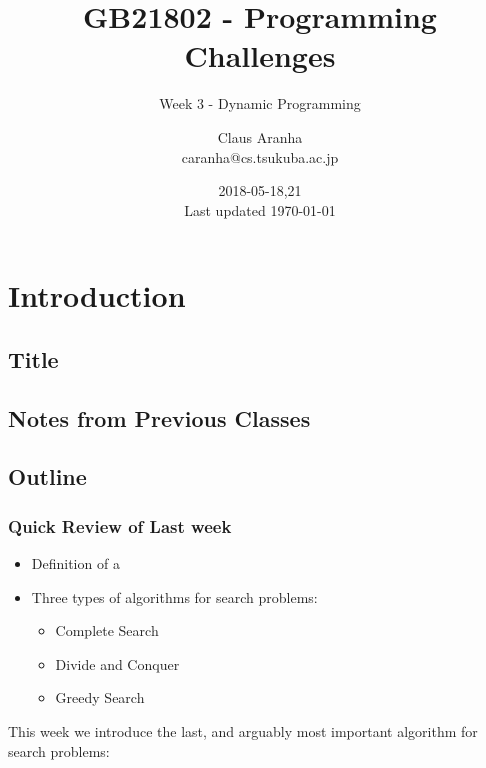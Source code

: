 \documentclass{beamer}
\title[GB21802]{GB21802 - Programming Challenges}
\subtitle[]{Week 3 - Dynamic Programming}
\author[Claus Aranha]{Claus Aranha\\{\footnotesize caranha@cs.tsukuba.ac.jp}}
\institute{College of Information Science}
\date{2018-05-18,21\\{\tiny Last updated \today}}
\begin{document}
\section{Introduction}
\subsection{Title}
\begin{frame}
\maketitle
\end{frame}

\subsection{Notes from Previous Classes}



\subsection{Outline}

\begin{frame}
  \frametitle{Quick Review of Last week}
  \begin{itemize}
  \item Definition of a 
  \item Three types of algorithms for search problems:
    \begin{itemize}
    \item Complete Search
    \item Divide and Conquer
    \item Greedy Search
    \end{itemize}
  \end{itemize}

  \bigskip
  
  \begin{block}{}
    This week we introduce the last, and arguably most important
    algorithm for search problems: 
  \end{block}
\end{frame}
\end{document}
